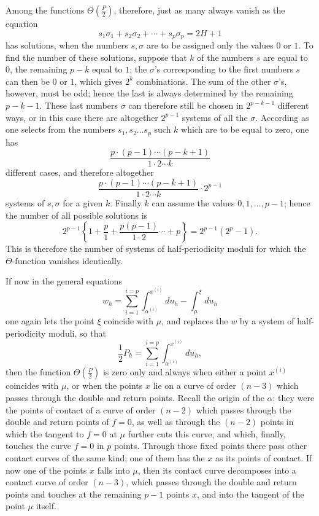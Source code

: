 \documentclass[10pt]{article}
\begin{document}
Among the functions \(\Theta\left(\frac P2\right)\), therefore, just as many always vanish as the equation
\[
s_1\sigma_1+s_2\sigma_2+\cdots+s_p\sigma_p=2H+1
\]
has solutions, when the numbers \(s,\sigma\) are to be assigned only the values \(0\) or \(1\). To find the number of these solutions, suppose that \(k\) of the numbers \(s\) are equal to \(0\), the remaining \(p-k\) equal to \(1\); the \(\sigma\)'s corresponding to the first numbers \(s\) can then be \(0\) or \(1\), which gives \(2^k\) combinations. The sum of the other \(\sigma\)'s, however, must be odd; hence the last is always determined by the remaining \(p-k-1\). These last numbers \(\sigma\) can therefore still be chosen in \(2^{p-k-1}\) different ways, or in this case there are altogether \(2^{p-1}\) systems of all the \(\sigma\). According as one selects from the numbers \(s_1,s_2\ldots s_p\) such \(k\) which are to be equal to zero, one has
\[
\frac{p\cdot(p-1)\cdots(p-k+1)}{1\cdot2\cdots k}
\]
different cases, and therefore altogether
\[
\frac{p\cdot(p-1)\cdots(p-k+1)}{1\cdot2\cdots k}\cdot2^{p-1}
\]
systems of \(s,\sigma\) for a given \(k\). Finally \(k\) can assume the values \(0,1,\ldots,p-1\); hence the number of all possible solutions is
\[
2^{p-1}\left\{1+\frac p1+\frac{p(p-1)}{1\cdot2}\cdots+p\right\}
=2^{p-1}(2^p-1).
\]
This is therefore the number of systems of half-periodicity moduli for which the \(\Theta\)-function vanishes identically.

If now in the general equations
\[
w_h=\sum_{i=1}^{i=p}\int_{\alpha^{(i)}}^{x^{(i)}}du_h-\int_{\mu}^{\xi}du_h
\]
one again lets the point \(\xi\) coincide with \(\mu\), and replaces the \(w\) by a system of half-periodicity moduli, so that
\[
\frac12P_h=\sum_{i=1}^{i=p}\int_{\alpha^{(i)}}^{x^{(i)}}du_h,
\]
then the function \(\Theta\left(\frac P2\right)\) is zero only and always when either a point \(x^{(i)}\) coincides with \(\mu\), or when the points \(x\) lie on a curve of order \((n-3)\) which passes through the double and return points. Recall the origin of the \(\alpha\): they were the points of contact of a curve of order \((n-2)\) which passes through the double and return points of \(f=0\), as well as through the \((n-2)\) points in which the tangent to \(f=0\) at \(\mu\) further cuts this curve, and which, finally, touches the curve \(f=0\) in \(p\) points. Through those fixed points there pass other contact curves of the same kind; one of them has the \(x\) as its points of contact. If now one of the points \(x\) falls into \(\mu\), then its contact curve decomposes into a contact curve of order \((n-3)\), which passes through the double and return points and touches at the remaining \(p-1\) points \(x\), and into the tangent of the point \(\mu\) itself.
\end{document}
